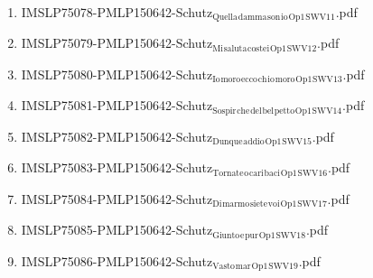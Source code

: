 \documentclass[11pt]{article}
\begin{document}
\begin{enumerate}
\begin{enumerate}
\item IMSLP75078-PMLP150642-Schutz$_{\text{Quella}}$$_{\text{damma}}$$_{\text{son}}$$_{\text{io}}$$_{\text{Op1}}$$_{\text{SWV11}}$.pdf
\label{sec-1-1-1-1-44-62-1-11}

\item IMSLP75079-PMLP150642-Schutz$_{\text{Mi}}$$_{\text{saluta}}$$_{\text{costei}}$$_{\text{Op1}}$$_{\text{SWV12}}$.pdf
\label{sec-1-1-1-1-44-62-1-12}

\item IMSLP75080-PMLP150642-Schutz$_{\text{Io}}$$_{\text{moro}}$$_{\text{ecco}}$$_{\text{ch}}$$_{\text{io}}$$_{\text{moro}}$$_{\text{Op1}}$$_{\text{SWV13}}$.pdf
\label{sec-1-1-1-1-44-62-1-13}

\item IMSLP75081-PMLP150642-Schutz$_{\text{Sospir}}$$_{\text{che}}$$_{\text{del}}$$_{\text{bel}}$$_{\text{petto}}$$_{\text{Op1}}$$_{\text{SWV14}}$.pdf
\label{sec-1-1-1-1-44-62-1-14}

\item IMSLP75082-PMLP150642-Schutz$_{\text{Dunque}}$$_{\text{addio}}$$_{\text{Op1}}$$_{\text{SWV15}}$.pdf
\label{sec-1-1-1-1-44-62-1-15}

\item IMSLP75083-PMLP150642-Schutz$_{\text{Tornate}}$$_{\text{o}}$$_{\text{cari}}$$_{\text{baci}}$$_{\text{Op1}}$$_{\text{SWV16}}$.pdf
\label{sec-1-1-1-1-44-62-1-16}

\item IMSLP75084-PMLP150642-Schutz$_{\text{Di}}$$_{\text{marmo}}$$_{\text{siete}}$$_{\text{voi}}$$_{\text{Op1}}$$_{\text{SWV17}}$.pdf
\label{sec-1-1-1-1-44-62-1-17}

\item IMSLP75085-PMLP150642-Schutz$_{\text{Giunto}}$$_{\text{e}}$$_{\text{pur}}$$_{\text{Op1}}$$_{\text{SWV18}}$.pdf
\label{sec-1-1-1-1-44-62-1-18}

\item IMSLP75086-PMLP150642-Schutz$_{\text{Vasto}}$$_{\text{mar}}$$_{\text{Op1}}$$_{\text{SWV19}}$.pdf
\label{sec-1-1-1-1-44-62-1-19}
\end{enumerate}
\end{enumerate}
\end{document}
